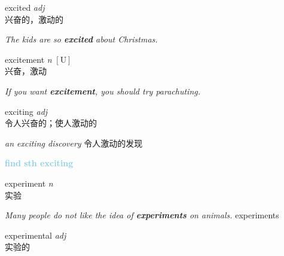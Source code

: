 \item[] {
    \lettrine{excited}{}  
    \textit{adj} \\
    兴奋的，激动的

    \textit{The kids are so \textbf{excited} about Christmas.}

} 

\item[] {
    \lettrine{excitement}{}  
    \textit{n} 
    $\mathrm{[U]}$ \\
    兴奋，激动

    \textit{If you want \textbf{excitement}, you should try parachuting.}

} 

\item[] {
    \lettrine{exciting}{}  
    \textit{adj} \\
    令人兴奋的；使人激动的

    \textit{an exciting discovery} 令人激动的发现

    \textbf {
        \textcolor{SkyBlue} {
            find sth exciting
        }
    }

}

\item[] {
    \lettrine{experiment}{}  
    \textit{n} \\
    实验

    
    \textit{Many people do not like the idea of \textbf{experiments} on animals.}
    experiments

}

\item[] {
    \lettrine{experimental}{}  
    \textit{adj} \\
    实验的

}